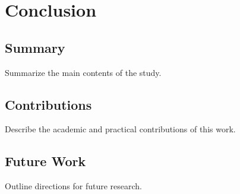 \chapter{Conclusion}
\label{ch:conclusion}

\section{Summary}

Summarize the main contents of the study.

\section{Contributions}

Describe the academic and practical contributions of this work.

\section{Future Work}

Outline directions for future research.
